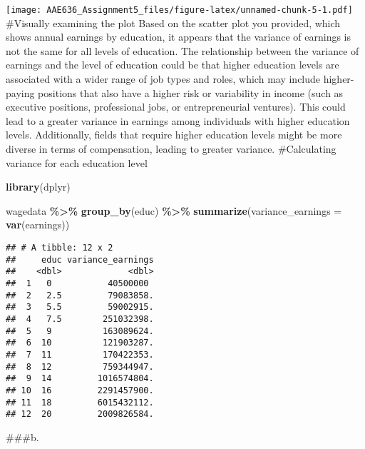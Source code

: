 \documentclass[
]{article}
\newenvironment{Shaded}{\begin{snugshade}}{\end{snugshade}}
\newcommand{\AttributeTok}[1]{\textcolor[rgb]{0.13,0.29,0.53}{#1}}
\newcommand{\FunctionTok}[1]{\textcolor[rgb]{0.13,0.29,0.53}{\textbf{#1}}}
\newcommand{\NormalTok}[1]{#1}
\newcommand{\SpecialCharTok}[1]{\textcolor[rgb]{0.81,0.36,0.00}{\textbf{#1}}}
\begin{document}
\texttt{[image: AAE636\_Assignment5\_files/figure-latex/unnamed-chunk-5-1.pdf]}
\#Visually examining the plot Based on the scatter plot you provided,
which shows annual earnings by education, it appears that the variance
of earnings is not the same for all levels of education. The
relationship between the variance of earnings and the level of education
could be that higher education levels are associated with a wider range
of job types and roles, which may include higher-paying positions that
also have a higher risk or variability in income (such as executive
positions, professional jobs, or entrepreneurial ventures). This could
lead to a greater variance in earnings among individuals with higher
education levels. Additionally, fields that require higher education
levels might be more diverse in terms of compensation, leading to
greater variance. \#Calculating variance for each education level

\begin{Shaded}
\begin{Highlighting}[]
\FunctionTok{library}\NormalTok{(dplyr)}

\NormalTok{wagedata }\SpecialCharTok{\%\textgreater{}\%} 
  \FunctionTok{group\_by}\NormalTok{(educ) }\SpecialCharTok{\%\textgreater{}\%}
  \FunctionTok{summarize}\NormalTok{(}\AttributeTok{variance\_earnings =} \FunctionTok{var}\NormalTok{(earnings))}
\end{Highlighting}
\end{Shaded}

\begin{verbatim}
## # A tibble: 12 x 2
##     educ variance_earnings
##    <dbl>             <dbl>
##  1   0           40500000 
##  2   2.5         79083858.
##  3   5.5         59002915.
##  4   7.5        251032398.
##  5   9          163089624.
##  6  10          121903287.
##  7  11          170422353.
##  8  12          759344947.
##  9  14         1016574804.
## 10  16         2291457900.
## 11  18         6015432112.
## 12  20         2009826584.
\end{verbatim}

\#\#\#b.
\end{document}
